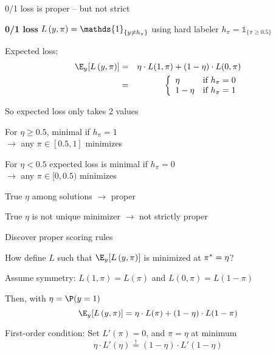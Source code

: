 \documentclass[11pt,compress,t,notes=noshow, xcolor=table]{beamer}
\begin{document}
\begin{framei}[sep=M]{0/1 loss is proper -- but not strict}

\item \textbf{0/1 loss} $\Lpiy=\mathds{1}_{\{y \neq h_\pi\}}$ using hard labeler  $h_{\pi}=\mathds{1}_{\{\pi\geq0.5\}}$ 
\item Expected loss:
\begin{eqnarray*}
\E_y[\Lpiy] &=& \eta \cdot L(1,\pi) + (1-\eta) \cdot L(0,\pi)\\
&=& \left\{
\begin{array}{ll}
\eta & \text{if } h_{\pi} = 0 \\
1-\eta & \text{if } h_{\pi} = 1
\end{array}
\right.
\end{eqnarray*}

\item So expected loss only takes 2 values

\item For $\eta \geq 0.5$, minimal if $h_{\pi}=1$\\ $\rightarrow$ any $\pi \in [0.5,1]$ minimizes 

\item For $\eta < 0.5$ expected loss is minimal if $h_{\pi}=0$\\ $\rightarrow$ any $\pi \in [0, 0.5)$ minimizes 

\item True $\eta$ among solutions $\rightarrow$ proper
\item True $\eta$ is not unique minimizer $\rightarrow$ not strictly proper

\end{framei}

\begin{frame}{Discover proper scoring rules}

\begin{itemizeL}

\item How define $L$ such that $\E_y[\Lpiy]$ is minimized at $\pi^{\ast}=\eta$? 

\item Assume symmetry: 
$L(1,\pi)=L(\pi)$ and $L(0,\pi)=L(1-\pi)$ \\

\end{itemizeL}

{}

\begin{itemizeL}
\item Then, with $\eta = \P(y = 1)$
$$\E_{y}[\Lpiy]=\eta \cdot L(\pi) + (1-\eta) \cdot L(1-\pi)$$
\item First-order condition: Set $L'(\pi) = 0$, and $\pi=\eta$ at minimum 
$$\eta \cdot L'(\eta) \overset{!}{=} (1-\eta) \cdot L'(1-\eta)$$

\end{itemizeL}
\end{frame}
\end{document}
